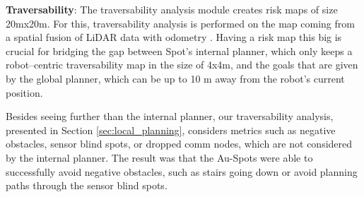 \documentclass[letterpaper, 10pt, conference]{ieeeconf}      %
\newcommand{\ph}[1]{{\textbf{#1}:}} %
\newcommand{\rev}[1]{{\color{blue} #1 }} %
\begin{document}






\ph{Traversability}
The traversability analysis module \rev{creates risk maps of size 20mx20m.}
For this, traversability analysis is performed on the map coming from a spatial fusion of LiDAR data with odometry \cite{oleynikova2017voxblox}.
Having a risk map this big is crucial for bridging the gap between Spot's internal planner, which only keeps a robot--centric traversability map in the size of 4x4m, and the goals that are given by the global planner, which can be up to 10 m away from the robot's current position.

Besides seeing further than the internal planner, our traversability analysis, presented in Section \ref{sec:local_planning}, considers metrics such as negative obstacles, sensor blind spots, or dropped comm nodes, which are not considered by the internal planner.
The result was that the Au-Spots were able to successfully avoid negative obstacles, such as stairs going down or avoid planning paths through the sensor blind spots.
\end{document}
